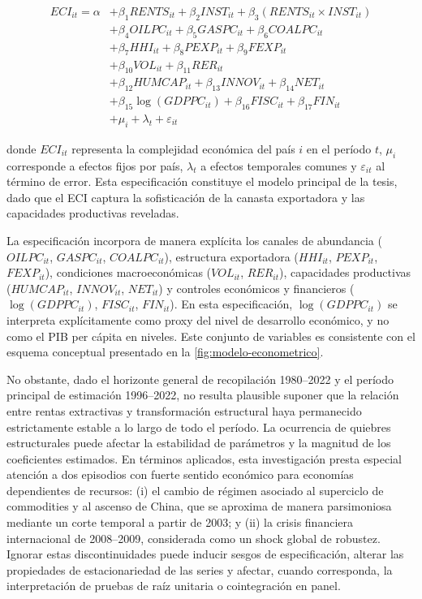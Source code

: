\documentclass[../../PTFM.tex]{subfiles}
\begin{document}
	\begin{equation}
		\label{eq:modelo_base}
		\begin{aligned}
			ECI_{it} = \alpha
			&+ \beta_1 RENTS_{it}
			+ \beta_2 INST_{it}
			+ \beta_3(RENTS_{it} \times INST_{it}) \\
			&+ \beta_4 OILPC_{it}
			+ \beta_5 GASPC_{it}
			+ \beta_6 COALPC_{it} \\
			&+ \beta_7 HHI_{it}
			+ \beta_8 PEXP_{it}
			+ \beta_9 FEXP_{it} \\
			&+ \beta_{10} VOL_{it}
			+ \beta_{11} RER_{it} \\
			&+ \beta_{12} HUMCAP_{it}
			+ \beta_{13} INNOV_{it}
			+ \beta_{14} NET_{it} \\
			&+ \beta_{15}\log(GDPPC_{it})
			+ \beta_{16} FISC_{it}
			+ \beta_{17} FIN_{it} \\
			&+ \mu_i + \lambda_t + \varepsilon_{it}
		\end{aligned}
	\end{equation}

	donde $ECI_{it}$ representa la complejidad económica del país $i$ en el período $t$, $\mu_i$ corresponde a efectos fijos por país, $\lambda_t$ a efectos temporales comunes y $\varepsilon_{it}$ al término de error. Esta especificación constituye el modelo principal de la tesis, dado que el ECI captura la sofisticación de la canasta exportadora y las capacidades productivas reveladas.

	La especificación incorpora de manera explícita los canales de abundancia ($OILPC_{it}$, $GASPC_{it}$, $COALPC_{it}$), estructura exportadora ($HHI_{it}$, $PEXP_{it}$, $FEXP_{it}$), condiciones macroeconómicas ($VOL_{it}$, $RER_{it}$), capacidades productivas ($HUMCAP_{it}$, $INNOV_{it}$, $NET_{it}$) y controles económicos y financieros ($\log(GDPPC_{it})$, $FISC_{it}$, $FIN_{it}$). En esta especificación, $\log(GDPPC_{it})$ se interpreta explícitamente como proxy del nivel de desarrollo económico, y no como el PIB per cápita en niveles. Este conjunto de variables es consistente con el esquema conceptual presentado en la \autoref{fig:modelo-econometrico}.

	No obstante, dado el horizonte general de recopilación 1980--2022 y el
	período principal de estimación 1996--2022, no resulta plausible suponer
	que la relación entre rentas extractivas y transformación estructural haya
	permanecido estrictamente estable a lo largo de todo el período. La
	ocurrencia de quiebres estructurales puede afectar la estabilidad de
	parámetros y la magnitud de los coeficientes estimados. En términos
	aplicados, esta investigación presta especial atención a dos episodios con
	fuerte sentido económico para economías dependientes de recursos: (i) el
	cambio de régimen asociado al superciclo de commodities y al ascenso de
	China, que se aproxima de manera parsimoniosa mediante un corte temporal a
	partir de 2003; y (ii) la crisis financiera internacional de 2008--2009,
	considerada como un shock global de robustez. Ignorar estas
	discontinuidades puede inducir sesgos de especificación, alterar las
	propiedades de estacionariedad de las series y afectar, cuando
	corresponda, la interpretación de pruebas de raíz unitaria o
	cointegración en panel.
\end{document}

